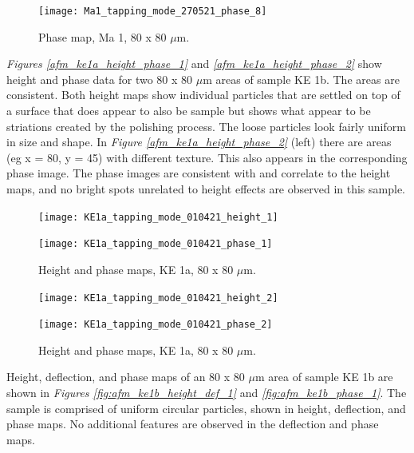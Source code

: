\begin{figure}[H]
\centering
  \texttt{[image: Ma1\_tapping\_mode\_270521\_phase\_8]}
\caption[Phase map, Ma 1]{Phase map, Ma 1, 80 x 80 $\mu$m.}
\label{fig:afm_ma1_phase_5}
\end{figure}



\textit{Figures \ref{afm_ke1a_height_phase_1}} and \textit{\ref{afm_ke1a_height_phase_2}} show height and phase data for two 80 x 80 $\mu$m areas of sample KE 1b. The areas are consistent. Both height maps show individual particles that are settled on top of a surface that does appear to also be sample but shows what appear to be striations created by the polishing process. The loose particles look fairly uniform in size and shape. In \textit{Figure \ref{afm_ke1a_height_phase_2}} (left) there are areas (eg x = 80, y = 45) with different texture. This also appears in the corresponding phase image. The phase images are consistent with and correlate to the height maps, and no bright spots unrelated to height effects are observed in this sample.


\begin{figure}[H]
\centering
\begin{minipage}{.45\textwidth}
  \centering
  \texttt{[image: KE1a\_tapping\_mode\_010421\_height\_1]}
\end{minipage}
\begin{minipage}{.45\textwidth}
  \centering
  \texttt{[image: KE1a\_tapping\_mode\_010421\_phase\_1]}
\end{minipage}
\caption[Height and phase maps, KE 1a]{Height and phase maps, KE 1a, 80 x 80 $\mu$m.}
\label{fig:afm_ke1a_height_phase_1}
\end{figure}


\begin{figure}[H]
\centering
\begin{minipage}{.45\textwidth}
  \centering
  \texttt{[image: KE1a\_tapping\_mode\_010421\_height\_2]}
\end{minipage}
\begin{minipage}{.45\textwidth}
  \centering
  \texttt{[image: KE1a\_tapping\_mode\_010421\_phase\_2]}
\end{minipage}
\caption[Height and phase maps, KE 1a]{Height and phase maps, KE 1a, 80 x 80 $\mu$m.}
\label{fig:afm_ke1a_height_phase_2}
\end{figure}



Height, deflection, and phase maps of an 80 x 80 $\mu$m area of sample KE 1b are shown in \textit{Figures \ref{fig:afm_ke1b_height_def_1}} and \textit{\ref{fig:afm_ke1b_phase_1}}. The sample is comprised of uniform circular particles, shown in height, deflection, and phase maps. No additional features are observed in the deflection and phase maps.

